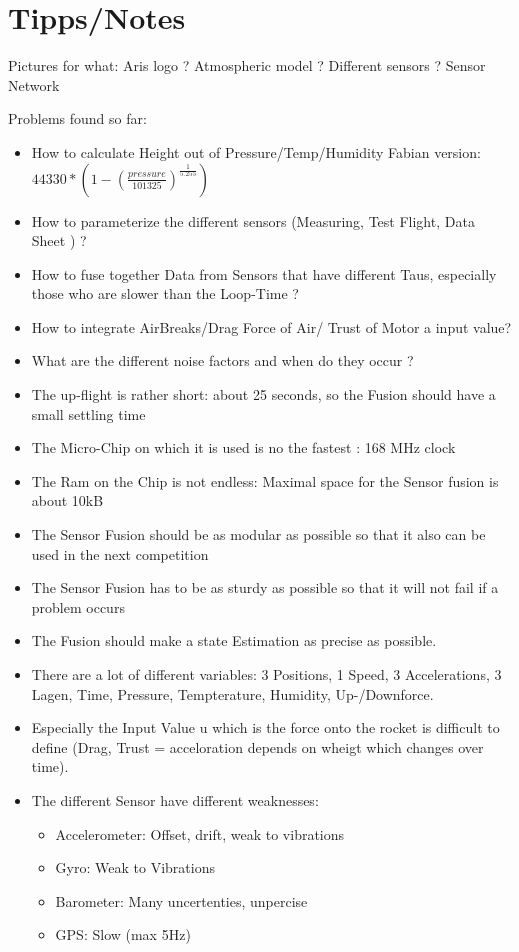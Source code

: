 
 \section{Tipps/Notes}
 Pictures for what:
 Aris logo ? 
 Atmospheric model ? 
 Different sensors ? 
 Sensor Network
 
 
 Problems found so far:
 \begin{itemize}
  \item How to calculate Height out of Pressure/Temp/Humidity Fabian version: $44330 * (1 - (\frac{pressure}{101325})^{ \frac{1}{5.255}})$
  \item How to parameterize the different sensors (Measuring, Test Flight, Data Sheet ) ? 
  \item How to fuse together Data from Sensors that have different Taus, especially those who are slower than the Loop-Time ?
  \item How to integrate AirBreaks/Drag Force of Air/ Trust of Motor a input value?
  \item What are the different noise factors and when do they occur ?
  \item The up-flight is rather short: about 25 seconds, so the Fusion should have a small settling time
  \item The Micro-Chip on which it is used is no the fastest : 168 MHz clock
  \item The Ram on the Chip is not endless: Maximal space for the Sensor fusion is about 10kB
  \item The Sensor Fusion should be as modular as possible so that it also can be used in the next competition
  \item The Sensor Fusion has to be as sturdy as possible so that it will not fail if a problem occurs
  \item The Fusion should make a state Estimation as precise as possible.
  \item There are a lot of different variables: 3 Positions, 1 Speed, 3 Accelerations, 3 Lagen, Time, Pressure, Tempterature, Humidity, Up-/Downforce.
  \item Especially the Input Value u which is the force onto the rocket is difficult to define (Drag, Trust = acceloration depends on wheigt which changes over time).
  \item The different Sensor have different weaknesses: \begin{itemize}
							 \item Accelerometer: Offset, drift, weak to vibrations
                                                         \item Gyro: Weak to Vibrations
                                                         \item Barometer: Many uncertenties, unpercise
                                                         \item GPS: Slow (max 5Hz)
                                                        \end{itemize}
                                                        
								  
 \end{itemize}
 
